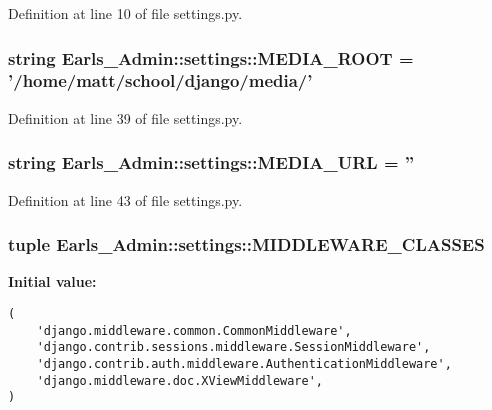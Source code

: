 Definition at line 10 of file settings.py.\hypertarget{namespaceEarls__Admin_1_1settings_48b28eec713c9de9ed6cb2ff2b8a5453}{
\subsubsection[MEDIA\_\-ROOT]{\setlength{\rightskip}{0pt plus 5cm}string {\bf Earls\_\-Admin::settings::MEDIA\_\-ROOT} = '/home/matt/school/django/media/'}}
\label{namespaceEarls__Admin_1_1settings_48b28eec713c9de9ed6cb2ff2b8a5453}




Definition at line 39 of file settings.py.\hypertarget{namespaceEarls__Admin_1_1settings_32367b73c89b853f97f4345da065eb4d}{
\subsubsection[MEDIA\_\-URL]{\setlength{\rightskip}{0pt plus 5cm}string {\bf Earls\_\-Admin::settings::MEDIA\_\-URL} = ''}}
\label{namespaceEarls__Admin_1_1settings_32367b73c89b853f97f4345da065eb4d}




Definition at line 43 of file settings.py.\hypertarget{namespaceEarls__Admin_1_1settings_a4d13fde465389a24a003c48cdec77f0}{
\subsubsection[MIDDLEWARE\_\-CLASSES]{\setlength{\rightskip}{0pt plus 5cm}tuple {\bf Earls\_\-Admin::settings::MIDDLEWARE\_\-CLASSES}}}
\label{namespaceEarls__Admin_1_1settings_a4d13fde465389a24a003c48cdec77f0}


\textbf{Initial value:}

\begin{Code}\begin{verbatim}(
    'django.middleware.common.CommonMiddleware',
    'django.contrib.sessions.middleware.SessionMiddleware',
    'django.contrib.auth.middleware.AuthenticationMiddleware',
    'django.middleware.doc.XViewMiddleware',
)
\end{verbatim}
\end{Code}


